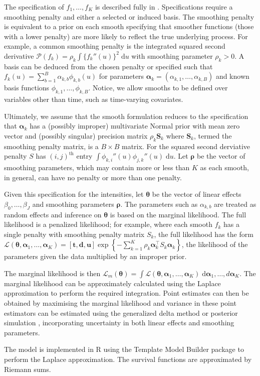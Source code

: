 \documentclass[referee]{rgclass}
\begin{document}
The specification of $f_1, \ldots, f_K$ is described fully in \citet{wood2017generalized}. Specifications require a smoothing penalty and either a selected or induced basis. The smoothing penalty is equivalent to a prior on each smooth specifying that smoother functions (those with a lower penalty) are more likely to reflect the true underlying process. For example, a common smoothing penalty is the integrated squared second derivative $\mathcal{P}(f_k) = \rho_k\int \{f_k''(u)\}^2 \;\mathrm{d}u$ with smoothing parameter $\rho_k > 0$. A basis can be deduced from the chosen penalty or specified such that $f_k(u) = \sum_{b = 1}^B \alpha_{k,b}\phi_{k,b}(u)$ for parameters $\bm\alpha_k = (\alpha_{k,1}, \ldots, \alpha_{k,B})$ and known basis functions $\phi_{k,1}, \ldots, \phi_{k,B}$. Notice, we allow smooths to be defined over variables other than time, such as time-varying covariates. 

Ultimately, we assume that the smooth formulation reduces to the specification that $\bm{\alpha}_k$ has a (possibly improper) multivariate Normal prior with mean zero vector and (possibly singular) precision matrix $\rho_k\bm{S}_k$ where $\bm{S}_k$, termed the smoothing penalty matrix, is a $B \times B$ matrix. For the squared second derviative penalty $S$ has $(i,j)^{\text{th}}$ entry $\int \phi_{k,i}''(u)\phi_{j,k}''(u)\;\mathrm{d}u$. Let $\bm\rho$ be the vector of smoothing parameters, which may contain more or less than $K$ as each smooth, in general, can have no penalty or more than one penalty. 

Given this specification for the intensities, let $\bm\theta$ be the vector of linear effects $\beta_0, \ldots, \beta_J$ and smoothing parameters $\bm\rho$.  The parameters such as $\alpha_{k, b}$ are treated as random effects and inference on $\bm\theta$ is based on the marginal likelihood. The full likelihood is a penalized likelihood; for example, where each smooth $f_k$ has a single penalty with smoothing penalty matrix $S_k$, the full likelihood has the form $\mathcal{L}(\bm\theta, \bm\alpha_1, \ldots, \bm\alpha_K) = [\bm{t}, \bm{d}, \bm{u}]\exp\left\{-\sum_{k = 1}^K \rho_k\bm\alpha_k^\intercal S_k \bm\alpha_k\right\}$, the likelihood of the parameters given the data multiplied by an improper prior. 

The marginal likelihood is then $\mathcal{L}_m(\bm\theta) = \int \mathcal{L}(\bm\theta, \bm\alpha_1, \ldots, \bm\alpha_K) \;\mathrm{d}\bm\alpha_1, \ldots,d\bm\alpha_K$. The marginal likelihood can be approximately calculated using the Laplace approximation to perform the required integration. Point estimates can then be obtained by maximising the marginal likelihood and variance in these point estimators can be estimated using the generalized delta method or posterior simulation \citep{wood2016smoothing, wood2017generalized}, incorporating uncertainty in both linear effects and smoothing parameters. 

The model is implemented in R \citep{R} using the Template Model Builder package \citep{TMB} to perform the Laplace approximation. The survival functions are approximated by Riemann sums. 
 



\end{document}
